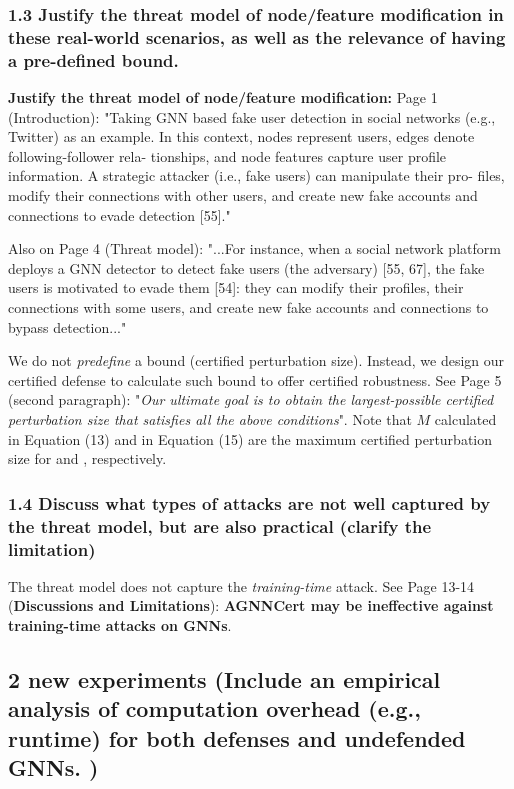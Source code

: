 \documentclass[10pt]{article}
\begin{document}
\subsubsection*{1.3 Justify the threat model of node/feature modification in these real-world scenarios, as well as the relevance of having a pre-defined bound.}

{\bf Justify the threat model of node/feature modification:} Page 1 (Introduction): {"Taking GNN based fake user detection in
social networks (e.g., Twitter) as an example. In this context,
nodes represent users, edges denote following-follower rela-
tionships, and node features capture user profile information.
A strategic attacker (i.e., fake users) can manipulate their pro-
files, modify their connections with other users, and create
new fake accounts and connections to evade detection [55]."}

Also on Page 4 (Threat model): {"...For instance, when a social network platform deploys a GNN detector to detect fake users (the adversary) [55, 67], the fake users is motivated to evade them [54]:
they can modify their profiles, their connections with some
users, and create new fake accounts and connections to bypass
detection..."}

\vspace{+0.05in}
 We do not \emph{predefine} a bound (certified perturbation size). Instead, we design our certified defense to calculate such bound to offer certified robustness. See Page 5 (second paragraph): "\emph{Our ultimate goal is to obtain the largest-possible certified
perturbation size that satisfies all the above conditions}". Note that $M$ calculated in Equation (13) and in Equation (15) are the maximum certified perturbation size for {\nameE} and {\nameN}, respectively. 

\subsubsection*{1.4 Discuss what types of attacks are not well captured by the threat model, but are also practical (clarify the limitation)}

The threat model does not capture the \emph{training-time} attack.  
See Page 13-14 ({\bf Discussions and Limitations}): {\bf AGNNCert may be ineffective against training-time attacks on GNNs}.


 \subsection*{2 new experiments (Include an empirical analysis of computation overhead (e.g., runtime) for both defenses and undefended GNNs. )} 
 
\end{document}
